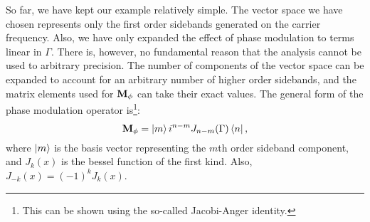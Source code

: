 So far, we have kept our example relatively simple. %
The vector space we have chosen represents only the first order sidebands generated on the carrier frequency. %
Also, we have only expanded the effect of phase modulation to terms linear in $\Gamma$. %
There is, however, no fundamental reason that the analysis cannot be used to arbitrary precision. %
The number of components of the vector space can be expanded to account for an arbitrary number of higher order sidebands, and the matrix elements used for $\mathbf{M_\phi}$ can take their exact values. %
The general form of the phase modulation operator is\footnote{This can be shown using the so-called Jacobi-Anger identity.}:
\begin{equation}
\mathbf{M_\phi} = \left| m \right> i^{n-m} J_{n-m}(\Gamma) \left< n \right|,
\end{equation}
where $\left| m \right>$ is the basis vector representing the $m$th order sideband component, and $J_k(x)$ is the bessel function of the first kind. %
Also, $J_{-k}(x)=(-1)^kJ_k(x)$.